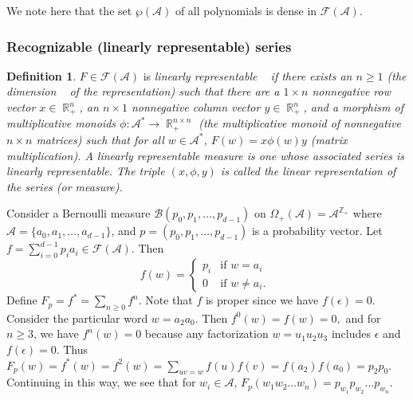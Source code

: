 \documentclass{kepart2010}
\theoremstyle{plain}
\theoremstyle{definition}
\newtheorem{defn}[thm]{Definition}
\theoremstyle{remark}
\theoremstyle{definition}
\numberwithin{equation}{section}
\begin{document}
We note here that the set $\wp ({{\mathcal A}})$ of all polynomials is dense in ${\mathcal F ({{\mathcal A}})}$.\\

\subsubsection{Recognizable (linearly representable)
series}\label{linrepser}

\begin{defn}\label{def_linrep}
$F \in {\mathcal F ({{\mathcal A}})}$ is \em linearly representable \em~ if there exists an $n
\geq 1$ (the \em dimension \em~ of the representation) such that
there are a $1 \times n$ nonnegative row vector $x \in \operatorname{\mathbb R}_{+}^{n}$,
an $n \times 1$ nonnegative column vector $y \in \operatorname{\mathbb R}_{+}^{n}$, and
a morphism of multiplicative monoids $\phi: \operatorname{{{\mathcal A}}^{*}} \rightarrow \operatorname{\mathbb R}_{+}^{n
\times n}$
 (the multiplicative monoid of nonnegative $n \times n$ matrices) such that for all
 $w \in \operatorname{{{\mathcal A}}^{*}}$, $F(w) = x \phi(w)
 y$ (matrix multiplication).
 A {\em linearly representable measure} is one whose associated
 series is linearly representable.
 The triple $(x,\phi,y)$ is called the {\em linear representation} of
 the series (or measure).
\end{defn}

\begin{ex} Consider a Bernoulli measure $\mathcal{B}(p_{0}, p_{1}, \dots , p_{d-1})$ on
 $\Omega_{+}({{\mathcal A}}) = {{\mathcal A}}^{\operatorname{\mathbb Z}_{+}}$ where ${{\mathcal A}} =  \{a_{0}, a_{1},
 \dots, a_{d-1}\}$, and
  $p =(p_{0}, p_{1}, \dots , p_{d-1})$ is a probability vector.  Let
  $f = \sum_{i=0}^{d-1}p_{i}a_{i} \in {\mathcal F ({{\mathcal A}})}$.
 Then
 $$f(w) =  \begin{cases}    p_{i}& \text{if $w = a_{i}$ }\\ 0 &
 \text{if $w \neq a_{i}$}  .  \end{cases} $$
 Define $F_{p} = f^{*} = \sum_{n \geq 0} f^{n}$. Note that $f$ is proper
 since we have $f(\epsilon) = 0$.
 Consider the particular word
 $w = a_{2}a_{0}$. Then
  $f^{0}(w) = f(w) =0,$ and
 for $n \geq 3$, we have $f^{n}(w) = 0$ because any factorization $w=u_{1}u_{2}u_{3}$
 includes
 $\epsilon$ and $f(\epsilon) = 0$.
 Thus $F_p(w)=f^*(w)=f^{2}(w) = \sum_{uv =w}f(u)f(v) = f(a_{2})f(a_0) = p_{2}p_{0}$.
 Continuing in this way, we see that for $w_{i} \in {{\mathcal A}}$,
 $F_{p}(w_{1} w_{2} \dots w_{n}) = p_{w_{1}}p_{w_{2}} \dots p_{w_{n}}$.
\end{ex}
\end{document}
